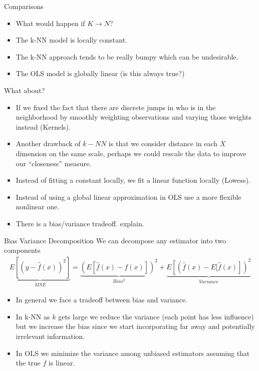 \documentclass[11pt,handout,xcolor=pdftex,dvipsnames,table,mathserif,aspectratio=169]{beamer}
\begin{document}
\begin{frame}{Comparisons}
\begin{itemize}
\item What would happen if $K \rightarrow N$?
\item The k-NN model is locally constant.
\item The k-NN approach tends to be really bumpy which can be undesirable.
\item The OLS model is globally linear (is this always true?)
\end{itemize}
\end{frame}
\begin{frame}{What about?}
\begin{itemize}
\item If we fixed the fact that there are discrete jumps in who is in the neighborhood by smoothly weighting observations and varying those weights instead (Kernels).
\item Another drawback of $k-NN$ is that we consider distance in each $X$ dimension on the same scale, perhaps we could rescale the data to improve our ``closeness'' measure.
\item Instead of fitting a constant locally, we fit a linear function locally (Lowess).
\item Instead of using a global linear approximation in OLS use a more flexible nonlinear one.
\item There is a bias/variance tradeoff. \alert{explain}.
\end{itemize}
\end{frame}

\begin{frame}{Bias Variance Decomposition}
We can decompose any estimator into two components
\begin{eqnarray*}
\underbrace{E[(y- \hat{f}(x))^2]}_{MSE} =\underbrace{\left( E[\hat{f}(x) - f(x)] \right)^2}_{Bias^2}  +  \underbrace{E \left[ \left(\hat{f}(x) - E[\hat{f}(x) \right] \right)^2}_{Variance} 
\end{eqnarray*}
\begin{itemize}
\item In general we face a tradeoff between bias and variance.
\item In k-NN as $k$ gets large we reduce the variance (each point has less influence) but we increase the bias since we start incorporating far away and potentially irrelevant information.
\item In OLS we minimize the variance among unbiased estimators assuming that the true $f$ is linear.
\end{itemize}
\end{frame}
\end{document}
